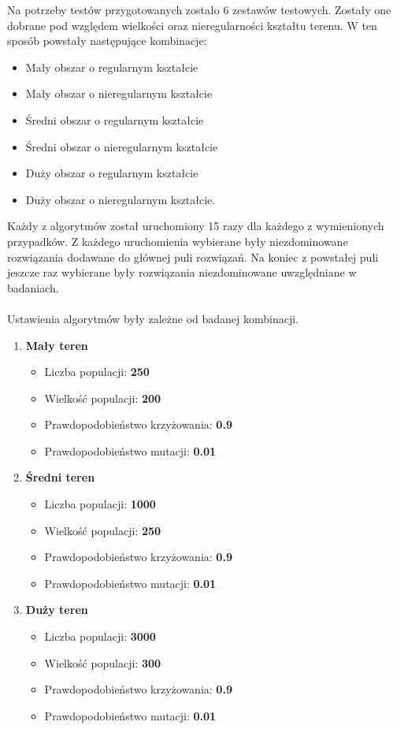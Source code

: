 \documentclass[twoside]{iisthesis}
\begin{document}
Na potrzeby testów przygotowanych zostało 6 zestawów testowych. Zostały one dobrane pod względem wielkości oraz nieregularności kształtu terenu. W ten sposób powstały następujące kombinacje:
\begin{itemize}
	\item Mały obszar o regularnym kształcie
	\item Mały obszar o nieregularnym kształcie
	\item Średni obszar o regularnym kształcie
	\item Średni obszar o nieregularnym kształcie
	\item Duży obszar o regularnym kształcie
	\item Duży obszar o nieregularnym kształcie.\\
\end{itemize}

Każdy z algorytmów został uruchomiony 15 razy dla każdego z wymienionych przypadków. Z każdego uruchomienia wybierane były niezdominowane rozwiązania dodawane do głównej puli rozwiązań. Na koniec z powstałej puli jeszcze raz wybierane były rozwiązania niezdominowane uwzględniane w badaniach.\\\\
Ustawienia algorytmów były zależne od badanej kombinacji.
\begin{enumerate}
	\item \textbf{Mały teren}
	\begin{itemize}
		\item Liczba populacji: \textbf{250}
		\item Wielkość populacji: \textbf{200}
		\item Prawdopodobieństwo krzyżowania: \textbf{0.9}
		\item Prawdopodobieństwo mutacji: \textbf{0.01}
	\end{itemize}
	\item \textbf{Średni teren}
		\begin{itemize}
		\item Liczba populacji: \textbf{1000}
		\item Wielkość populacji: \textbf{250}
		\item Prawdopodobieństwo krzyżowania: \textbf{0.9}
		\item Prawdopodobieństwo mutacji: \textbf{0.01}
	\end{itemize}
	\item \textbf{Duży teren}
		\begin{itemize}
		\item Liczba populacji: \textbf{3000}
		\item Wielkość populacji: \textbf{300}
		\item Prawdopodobieństwo krzyżowania: \textbf{0.9}
		\item Prawdopodobieństwo mutacji: \textbf{0.01}
	\end{itemize}
\end{enumerate}
\end{document}
